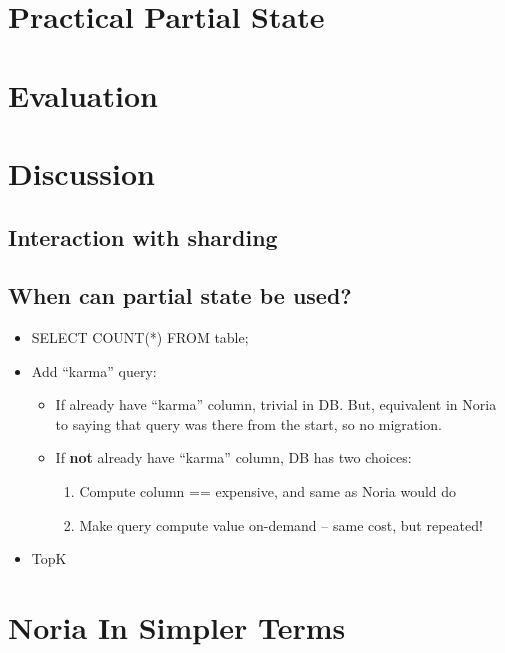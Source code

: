 \documentclass[fontsize=12pt,paper=letter,draft=true]{scrbook}
\begin{document}
\chapter{Practical Partial State}

\chapter{Evaluation}



\chapter{Discussion}

\section{Interaction with sharding}

\section{When can partial state be used?}

\begin{itemize}
 \item SELECT COUNT(*) FROM table;
 \item Add ``karma'' query:
   \begin{itemize}
    \item If already have ``karma'' column, trivial in DB. But, equivalent in
      Noria to saying that query was there from the start, so no migration.
    \item If \textbf{not} already have ``karma'' column, DB has two choices:
     \begin{enumerate}
      \item Compute column == expensive, and same as Noria would do
      \item Make query compute value on-demand -- same cost, but repeated!
     \end{enumerate}
   \end{itemize}
 \item TopK
\end{itemize}

\appendix
\chapter{Noria In Simpler Terms}

\backmatter

\begin{spacing}{1}
\printbibliography
\end{spacing}
\end{document}
